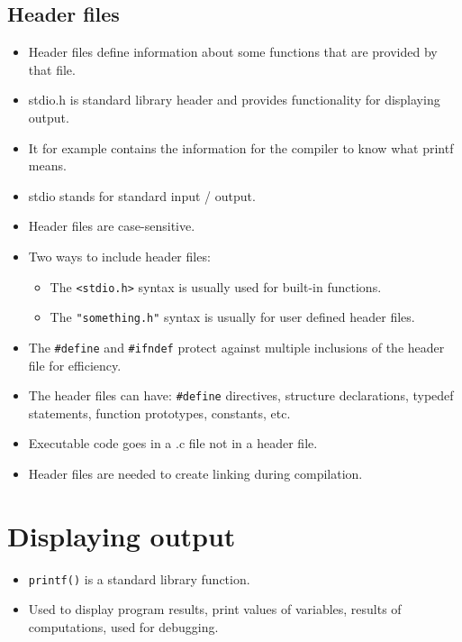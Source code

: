 \subsection{Header files}
\begin{itemize}
    \item Header files define information about some functions that are provided by that file. 
    \item stdio.h is standard library header and provides functionality for displaying output. 
    \item It for example contains the information for the compiler to know what printf means.
    \item stdio stands for standard input / output.
    \item Header files are case-sensitive.
    \item Two ways to include header files:  
        \begin{itemize}
            \item The \texttt{<stdio.h>} syntax is usually used for built-in functions.
            \item The \texttt{"something.h"} syntax is usually for user defined header files.
        \end{itemize}
    
    \item The \texttt{#define} and \texttt{#ifndef} protect against multiple inclusions of the header file for efficiency.
    \item The header files can have: \texttt{#define} directives, structure declarations, typedef statements, function prototypes, constants, etc.
    \item Executable code goes in a .c file not in a header file. 
    \item Header files are needed to create linking during compilation. 
\end{itemize}


\section{Displaying output}
\begin{itemize}
    \item \texttt{printf()} is a standard library function. 
    \item Used to display program results, print values of variables, results of computations, used for debugging. 
\end{itemize}

